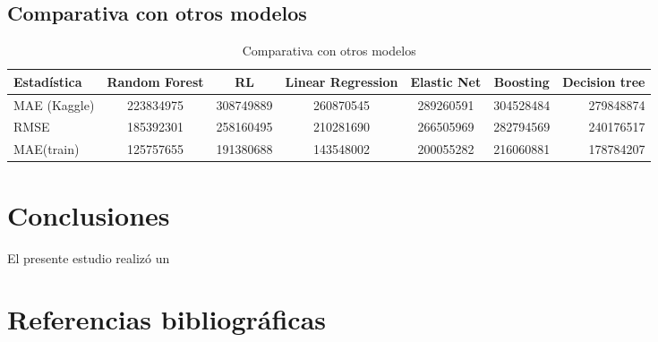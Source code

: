 \documentclass[
  11pt,
  letterpaper,
]{article}
\begin{document}
\hypertarget{comparativa-con-otros-modelos}{%
\subsection{Comparativa con otros modelos}\label{comparativa-con-otros-modelos}}

\begin{table}[ht]
\centering
\caption{Comparativa con otros modelos}
\begin{tabular}{lcccccr}
\hline \hline
Estadística & Random Forest & RL & Linear Regression & Elastic Net & Boosting & Decision tree \\
\hline
MAE (Kaggle) & 223834975 & 308749889 & 260870545 & 289260591 & 304528484 & 279848874 \\
RMSE & 185392301 & 258160495 & 210281690 & 266505969 & 282794569 & 240176517 \\
MAE(train) & 125757655 & 191380688 & 143548002 & 200055282 & 216060881 & 178784207 \\
\hline
\end{tabular}
\end{table}

\hypertarget{conclusiones}{%
\section{Conclusiones}\label{conclusiones}}

El presente estudio realizó un

\hypertarget{referencias-bibliogruxe1ficas}{%
\section{Referencias bibliográficas}\label{referencias-bibliogruxe1ficas}}
\end{document}

